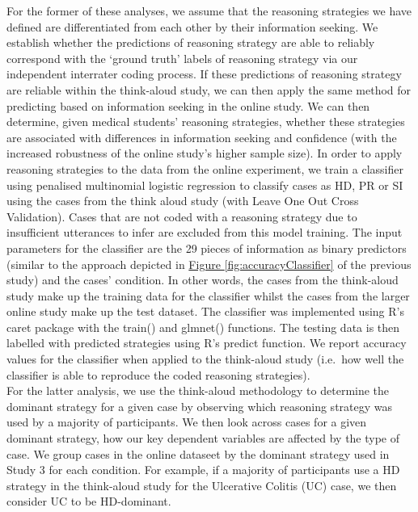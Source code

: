 \documentclass[a4paper, nobind]{templates/ociamthesis}
\begin{document}
For the former of these analyses, we assume that the reasoning strategies we have defined are differentiated from each other by their information seeking. We establish whether the predictions of reasoning strategy are able to reliably correspond with the `ground truth' labels of reasoning strategy via our independent interrater coding process. If these predictions of reasoning strategy are reliable within the think-aloud study, we can then apply the same method for predicting based on information seeking in the online study. We can then determine, given medical students' reasoning strategies, whether these strategies are associated with differences in information seeking and confidence (with the increased robustness of the online study's higher sample size). In order to apply reasoning strategies to the data from the online experiment, we train a classifier using penalised multinomial logistic regression to classify cases as HD, PR or SI using the cases from the think aloud study (with Leave One Out Cross Validation). Cases that are not coded with a reasoning strategy due to insufficient utterances to infer are excluded from this model training. The input parameters for the classifier are the 29 pieces of information as binary predictors (similar to the approach depicted in \hyperref[fig:accuracyClassifier]{Figure \ref{fig:accuracyClassifier}} of the previous study) and the cases' condition. In other words, the cases from the think-aloud study make up the training data for the classifier whilst the cases from the larger online study make up the test dataset. The classifier was implemented using R's caret package with the train() and glmnet() functions. The testing data is then labelled with predicted strategies using R's predict function. We report accuracy values for the classifier when applied to the think-aloud study (i.e.~how well the classifier is able to reproduce the coded reasoning strategies).\\

For the latter analysis, we use the think-aloud methodology to determine the dominant strategy for a given case by observing which reasoning strategy was used by a majority of participants. We then look across cases for a given dominant strategy, how our key dependent variables are affected by the type of case. We group cases in the online dataseet by the dominant strategy used in Study 3 for each condition. For example, if a majority of participants use a HD strategy in the think-aloud study for the Ulcerative Colitis (UC) case, we then consider UC to be HD-dominant.
\end{document}
